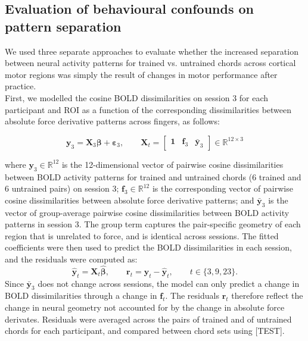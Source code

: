 \documentclass{article}
\begin{document}
\subsection{Evaluation of behavioural confounds on pattern separation}

We used three separate approaches to evaluate whether the increased separation between neural activity patterns for trained vs. untrained chords across cortical motor regions was simply the result of changes in motor performance after practice. \\

First, we modelled the cosine BOLD dissimilarities on session 3 for each participant and ROI as a function of the corresponding dissimilarities between absolute force derivative patterns across fingers, as follows:

\begin{equation}
    \mathbf{y}_3 = \mathbf{X}_3 \boldsymbol{\beta} + \boldsymbol{\varepsilon}_3,
    \qquad
    \mathbf{X}_t = \begin{bmatrix} \mathbf{1} & \mathbf{f}_3 & \bar{\mathbf{y}}_3 \end{bmatrix} \in \mathbb{R}^{12 \times 3}
\end{equation}

where $\mathbf{y}_3 \in \mathbb{R}^{12}$ is the 12-dimensional vector of pairwise cosine dissimilarities between BOLD activity patterns for trained and untrained chords (6 trained and 6 untrained pairs) on session 3; $\mathbf{f}_3 \in \mathbb{R}^{12}$ is the corresponding vector of pairwise cosine dissimilarities between absolute force derivative patterns; and $\bar{\mathbf{y}}_3$ is the vector of group-average pairwise cosine dissimilarities between BOLD activity patterns in session 3. The group term captures the pair-specific geometry of each region that is unrelated to force, and is identical across sessions. The fitted coefficients were then used to predict the BOLD dissimilarities in each session, and the residuals were computed as:
\begin{equation}
    \hat{\mathbf{y}}_t = \mathbf{X}_t \hat{\boldsymbol{\beta}},
    \qquad
    \mathbf{r}_t = \mathbf{y}_t - \hat{\mathbf{y}}_t,
    \qquad t \in \{3, 9, 23\}.
\end{equation}
Since $\bar{\mathbf{y}}_3$ does not change across sessions, the model can only predict a change in BOLD dissimilarities through a change in $\mathbf{f}_t$. The residuals $\mathbf{r}_t$ therefore reflect the change in neural geometry not accounted for by the change in absolute force derivates. Residuals were averaged across the pairs of trained and of untrained chords for each participant, and compared between chord sets using [TEST]. \\
\end{document}
